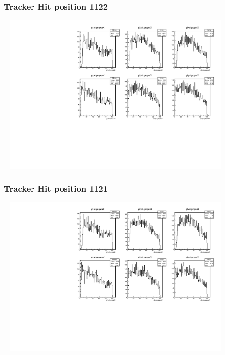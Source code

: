 \documentclass[slidestop,compress,mathserif]{beamer}
\begin{document}
\begin{frame}\frametitle{Tracker Hit position 1122}
	 \includegraphics[width=12cm,height=8cm]{Tracker_Hit_position_1122.pdf}
\end{frame}
\begin{frame}\frametitle{Tracker Hit position 1121}
	 \includegraphics[width=12cm,height=8cm]{Tracker_Hit_position_1121.pdf}
\end{frame}
\end{document}
